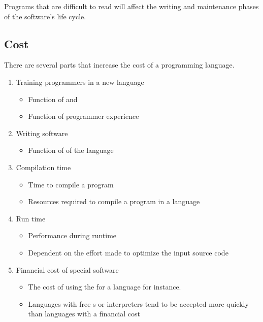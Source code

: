 Programs that are difficult to read will affect the writing and maintenance phases of the software's life cycle.

\subsection{Cost}\label{subsec:Cost}
There are several parts that increase the cost of a programming language.
\begin{enumerate}[noitemsep]
\item Training programmers in a new language
  \begin{itemize}[noitemsep]
  \item Function of  and 
  \item Function of programmer experience
  \end{itemize}
  
\item Writing software
  \begin{itemize}[noitemsep]
  \item Function of  of the language
  \end{itemize}
  
\item Compilation time
  \begin{itemize}[noitemsep]
  \item Time to compile a program
  \item Resources required to compile a program in a language
  \end{itemize}

\item Run time
  \begin{itemize}[noitemsep]
  \item Performance during runtime
  \item Dependent on the effort made to optimize the input source code
  \end{itemize}

\item Financial cost of special software
  \begin{itemize}[noitemsep]
  \item The cost of using the  for a language for instance.
  \item Languages with free s or interpreters tend to be accepted more quickly than languages with a financial cost
  \end{itemize}


\end{enumerate}
